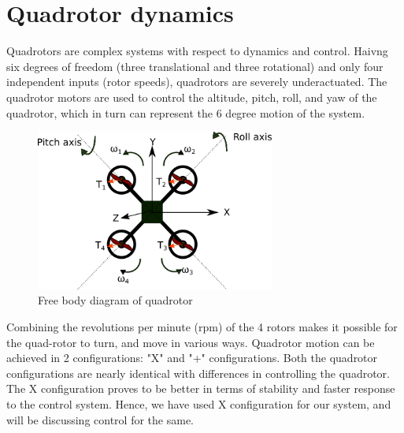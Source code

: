 \documentclass[hidelinks,BTech]{iitmdiss}
\begin{document}
%
%


\section{Quadrotor dynamics}
Quadrotors are complex systems with respect to dynamics and control. Haivng six degrees of freedom (three translational and three rotational) and only four independent inputs (rotor speeds), quadrotors are severely underactuated. The quadrotor motors are used to control the altitude, pitch, roll, and yaw of the quadrotor, which in turn can represent the 6 degree motion of the system.
\begin{figure}[H]
  \centering
    \includegraphics[width=0.7\textwidth]{Quadrotor_fbd.png}
    \caption{Free body diagram of quadrotor}
\end{figure}
Combining the revolutions per minute (rpm) of the 4 rotors makes it possible for the quad-rotor to turn, and move in various ways. Quadrotor motion can be achieved in 2 configurations: "X" and "+" configurations. Both the quadrotor configurations are nearly identical with differences in controlling the quadrotor. The X configuration proves to be better in terms of stability and faster response to the control system. Hence, we have used X configuration for our system, and will be discussing control for the same.
\end{document}
